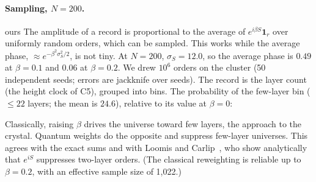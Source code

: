 \documentclass[11pt,a4paper]{article}
\newcommand{\tagbox}[2]{\textsf{\scriptsize\colorbox{#1!12}{\textcolor{#1!70!black}{#2}}}}
\newcommand{\ours}{\tagbox{orange}{ours}}
\begin{document}
\paragraph{Sampling, $N=200$.} \ours{} The amplitude of a record is proportional to the average of $e^{i\beta S}\mathbf 1_r$ over uniformly random orders, which can be sampled. This works while the average phase, $\approx e^{-\beta^2\sigma_S^2/2}$, is not tiny. At $N=200$, $\sigma_S=12.0$, so the average phase is $0.49$ at $\beta=0.1$ and $0.06$ at $\beta=0.2$. We drew $10^6$ orders on the cluster (50 independent seeds; errors are jackknife over seeds). The record is the layer count (the height clock of C5), grouped into bins. The probability of the few-layer bin ($\le22$ layers; the mean is $24.6$), relative to its value at $\beta=0$:
\begin{center}
\end{center}
Classically, raising $\beta$ drives the universe toward few layers, the approach to the crystal. Quantum weights do the opposite and suppress few-layer universes. This agrees with the exact sums and with Loomis and Carlip~\cite{LoomisCarlip18}, who show analytically that $e^{iS}$ suppresses two-layer orders. (The classical reweighting is reliable up to $\beta=0.2$, with an effective sample size of 1{,}022.)
\end{document}
